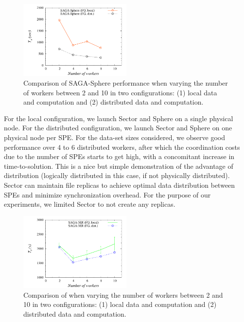 \documentclass[3p,twocolumn]{elsarticle}
\begin{document}
\begin{figure}[htb!]
 \includegraphics[width=0.5\textwidth]{figures/sphere_varying_workers.pdf}
 \caption{
   Comparison of SAGA-Sphere performance when varying the number of workers
   between 2 and 10 in two configurations: (1) local data and computation
   and (2) distributed data and computation.
   \label{fig:sphere_varying_workers}
   }
\end{figure}

For the local configuration, we launch Sector and Sphere on a single
physical node.  For the distributed configuration, we launch Sector
and Sphere on one physical node per SPE.  For the data-set sizes
considered, we observe good performance over 4 to 6 distributed
workers, after which the coordination costs due to the number of SPEs
starts to get high, with a concomitant increase in
time-to-solution. This is a nice but simple demonstration of the
advantage of distribution (logically distributed in this case, if not
physically distributed). Sector can maintain file replicas to achieve
optimal data distribution between SPEs and minimize synchronization
overhead. For the purpose of our experiments, we limited Sector to not
create any replicas.




\begin{figure}[htb!]
 \dnnn\dnnn
 \includegraphics[width=0.5\textwidth]{figures/sagamr_varying_workers.pdf}
 \caption{ Comparison of \sagamapreduce when varying the number of
   workers between 2 and 10 in two configurations: (1) local data and
   computation and (2) distributed data and computation.
   \label{fig:sagamr_varying_workers}
   }
\end{figure}
\end{document}
